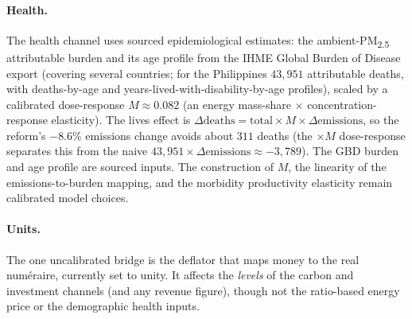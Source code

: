\paragraph{Health.}
The health channel uses sourced epidemiological estimates: the ambient-PM\textsubscript{2.5}
attributable burden and its age profile from the IHME Global Burden of Disease export
(covering several countries; for the Philippines $43{,}951$ attributable deaths, with
deaths-by-age and years-lived-with-disability-by-age profiles), scaled by a calibrated
dose-response $M\approx0.082$ (an energy mass-share $\times$ concentration-response
elasticity). The lives effect is
$\Delta\text{deaths}=\text{total}\times M\times\Delta\text{emissions}$, so the reform's
$-8.6\%$ emissions change avoids about $311$ deaths (the $\times M$
dose-response separates
this from the naive $43{,}951\times\Delta\text{emissions}\approx-3{,}789$). The GBD burden
and age profile are sourced inputs. The construction of $M$, the linearity of the
emissions-to-burden mapping, and the morbidity productivity elasticity remain calibrated
model choices.

\paragraph{Units.}
The one uncalibrated bridge is the deflator that maps \CLEWS{} money to the \OGCore{} real
numéraire, currently set to unity. It affects the \emph{levels} of the carbon and
investment channels (and any revenue figure), though not the ratio-based energy price or
the demographic health inputs.

